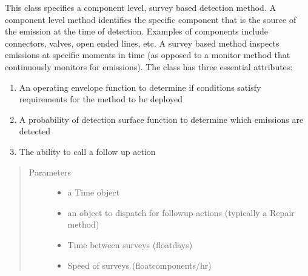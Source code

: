 \documentclass[letterpaper,10pt,english]{sphinxmanual}
\begin{document}
\begin{fulllineitems}
\label{\detokenize{index:feast.DetectionModules.comp_survey.CompSurvey}}
This class specifies a component level, survey based detection method.
A component level method identifies the specific component that is the source of the
emission at the time of detection. Examples of components include connectors, valves, open ended lines, etc.
A survey based method inspects emissions at specific moments in time (as opposed to a monitor method that
continuously monitors for emissions).
The class has three essential attributes:
\begin{enumerate}
%
\item {} 
An operating envelope function to determine if conditions satisfy requirements for the method to be deployed

\item {} 
A probability of detection surface function to determine which emissions are detected

\item {} 
The ability to call a follow up action

\end{enumerate}
\begin{quote}\begin{description}
\item[{Parameters}] \leavevmode\begin{itemize}
\item {} 
 \textendash{} a Time object

\item {} 
 \textendash{} an object to dispatch for follow\sphinxhyphen{}up actions (typically a Repair method)

\item {} 
 \textendash{} Time between surveys (float\textendash{}days)

\item {} 
 \textendash{} Speed of surveys (float\textendash{}components/hr)


\end{itemize}
\end{description}
\end{quote}
\end{fulllineitems}
\end{document}
